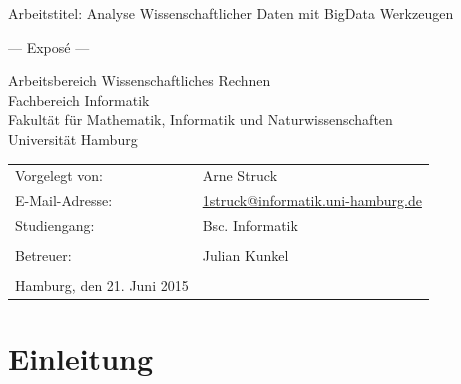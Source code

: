 \documentclass[
	12pt,
	a4paper,
	BCOR10mm,
	DIV14,
	listof=totoc,
	bibliography=totoc,
	headsepline
]{scrreprt}
\begin{document}
\begin{titlepage}
	\begin{center}
		{\titlefont\huge Arbeitstitel: Analyse Wissenschaftlicher Daten mit BigData Werkzeugen \par}

		\bigskip
		\bigskip

		{\titlefont\Large --- Exposé ---\par}

		\bigskip
		\bigskip

		{\large Arbeitsbereich Wissenschaftliches Rechnen\\
		Fachbereich Informatik\\
		Fakultät für Mathematik, Informatik und Naturwissenschaften\\
		Universität Hamburg\par}
	\end{center}

	\vfill

	{\large \begin{tabular}{ll}
		Vorgelegt von: & Arne Struck \\
		E-Mail-Adresse: 
			& \href{mailto:1struck@informatik.uni-hamburg.de}{1struck@informatik.uni-hamburg.de} \\ 
		Studiengang: & Bsc. Informatik \\
		\\
		Betreuer: & Julian Kunkel \\
		\\
		Hamburg, den 21. Juni 2015%
	\end{tabular}\par}
\end{titlepage}

\thispagestyle{empty}

\newpage\null\thispagestyle{empty}\newpage
\tableofcontents
\newpage\null\thispagestyle{empty}\newpage

\chapter{Einleitung}
\label{einleitung}
\end{document}
